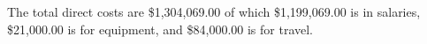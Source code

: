The total direct costs are \$1,304,069.00 of which \$1,199,069.00 is in salaries, \$21,000.00 is for equipment, and \$84,000.00 is for travel.